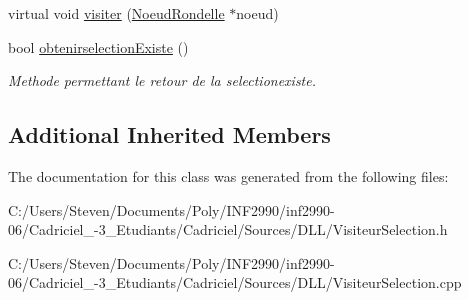 \begin{DoxyCompactItemize}
\item 
virtual void \hyperlink{group__inf2990_ga81f3ec46afbfe7fdbc5a3406991e00b7}{visiter} (\hyperlink{class_noeud_rondelle}{Noeud\+Rondelle} $\ast$noeud)
\item 
\hypertarget{class_visiteur_selection_aa2882688ed42325b7ecf6b17be4fcc72}{}\label{class_visiteur_selection_aa2882688ed42325b7ecf6b17be4fcc72} 
bool \hyperlink{class_visiteur_selection_aa2882688ed42325b7ecf6b17be4fcc72}{obtenirselection\+Existe} ()
\begin{DoxyCompactList}\small\item\em Methode permettant le retour de la selectionexiste. \end{DoxyCompactList}\end{DoxyCompactItemize}
\subsection*{Additional Inherited Members}


The documentation for this class was generated from the following files\+:\begin{DoxyCompactItemize}
\item 
C\+:/\+Users/\+Steven/\+Documents/\+Poly/\+I\+N\+F2990/inf2990-\/06/\+Cadriciel\+\_-\/3\+\_\+\+Etudiants/\+Cadriciel/\+Sources/\+D\+L\+L/Visiteur\+Selection.\+h\item 
C\+:/\+Users/\+Steven/\+Documents/\+Poly/\+I\+N\+F2990/inf2990-\/06/\+Cadriciel\+\_-\/3\+\_\+\+Etudiants/\+Cadriciel/\+Sources/\+D\+L\+L/Visiteur\+Selection.\+cpp\end{DoxyCompactItemize}
